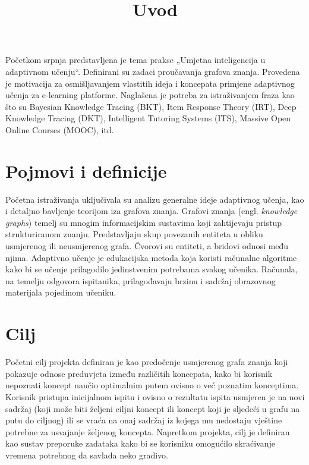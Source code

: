\documentclass{report}
\newcommand{\mydate}{\formatdate{13}{7}{2020}}
\begin{document}
\title{Uvod}
\date{\mydate}
\maketitle

\noindent Početkom srpnja predstavljena je tema prakse „Umjetna inteligencija u adaptivnom učenju“. Definirani su zadaci proučavanja grafova znanja. Provedena je motivacija za osmišljavanjem vlastitih ideja i koncepata primjene adaptivnog učenja za e-learning platforme. Naglašena je potreba za istraživanjem fraza kao što su Bayesian Knowledge Tracing (BKT), Item Response Theory (IRT), Deep Knowledge Tracing (DKT), Intelligent Tutoring Systems (ITS), Massive Open Online Courses (MOOC), itd.

\chapter{Pojmovi i definicije}

Početna istraživanja uključivala su analizu generalne ideje adaptivnog učenja, kao i detaljno bavljenje teorijom iza grafova znanja.
\newline
\newline
Grafovi znanja (engl. \textit{knowledge graphs}) temelj su mnogim informacijskim sustavima koji zahtijevaju pristup strukturiranom znanju. Predstavljaju skup povezanih entiteta u obliku usmjerenog ili neusmjerenog grafa. Čvorovi su entiteti, a bridovi odnosi među njima.
\newline
\newline
Adaptivno učenje je edukacijska metoda koja koristi računalne algoritme kako bi se učenje prilagodilo jedinstvenim potrebama svakog učenika. Računala, na temelju odgovora ispitanika, prilagođavaju brzinu i sadržaj obrazovnog materijala pojedinom učeniku.

\chapter{Cilj}
Početni cilj projekta definiran je kao predočenje usmjerenog grafa znanja koji pokazuje odnose preduvjeta između različitih koncepata, kako bi korisnik nepoznati koncept naučio optimalnim putem ovisno o već poznatim konceptima. Korisnik pristupa inicijalnom ispitu i ovisno o rezultatu ispita usmjeren je na novi sadržaj (koji može biti željeni ciljni koncept ili koncept koji je sljedeći u grafu na putu do ciljnog) ili se vraća na onaj sadržaj iz kojega mu nedostaju vještine potrebne za usvajanje željenog koncepta.
\newline
\newline
Napretkom projekta, cilj je definiran kao sustav preporuke zadataka kako bi se korisniku omogućilo skraćivanje vremena potrebnog da savlada neko gradivo. 
\end{document}
